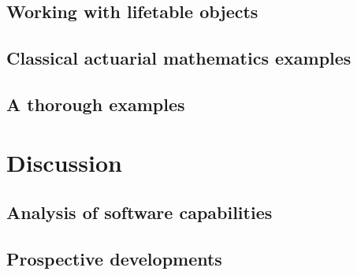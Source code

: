 \documentclass[a4paper]{article}
\begin{document}
\subsection{Working with lifetable objects}

\subsection{Classical actuarial mathematics examples}

\subsection{A thorough examples}

\clearpage
\newpage

\section{Discussion} \label{sec:discussion}

\subsection{Analysis of software capabilities}
\subsection{Prospective developments}

%
\end{document}
